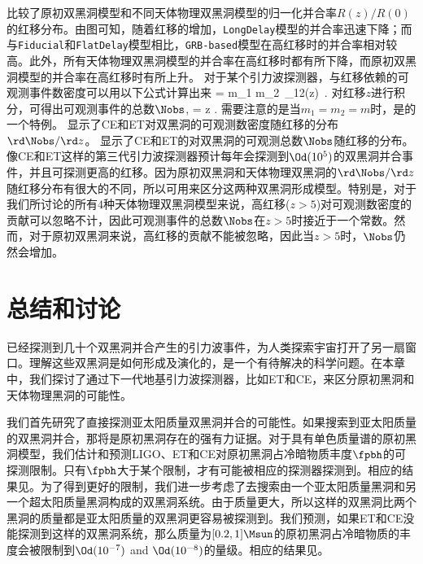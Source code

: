 比较了原初双黑洞模型和不同天体物理双黑洞模型的归一化并合率$R(z)/R(0)$的红移分布。由图可知，随着红移的增加，\texttt{LongDelay}模型的并合率迅速下降；而与\texttt{Fiducial}和\texttt{FlatDelay}模型相比，\texttt{GRB-based}模型在高红移时的并合率相对较高。此外，所有天体物理双黑洞模型的并合率在高红移时都有所下降，而原初双黑洞模型的并合率在高红移时有所上升。
对于某个引力波探测器，与红移依赖的可观测事件数密度可以用以下公式计算出来
\e\label{event_density} 
 = \int \rd m_1 \rd m_2\, \mR_{12}(z)\,
.
\q 
对红移$z$进行积分，可得出可观测事件的总数$\Nobs$,
\e\label{Nobs2} 
\Nobs = \int \rd z .
\q 
需要注意的是当$m_1 = m_2 = m$时，是的一个特例。
显示了CE和ET对双黑洞的可观测数密度随红移的分布$\rd \Nobs/\rd z$。
 显示了CE和ET的对双黑洞的可观测总数$\Nobs$随红移的分布。
像CE和ET这样的第三代引力波探测器预计每年会探测到$\Od(10^5)$的双黑洞并合事件，并且可探测更高的红移。因为原初双黑洞和天体物理双黑洞的$\rd \Nobs/\rd z$随红移分布有很大的不同，所以可用来区分这两种双黑洞形成模型。特别是，对于我们所讨论的所有$4$种天体物理双黑洞模型来说，高红移($z>5$)对可观测数密度的贡献可以忽略不计，因此可观测事件的总数$\Nobs$在$z>5$时接近于一个常数。然而，对于原初双黑洞来说，高红移的贡献不能被忽略，因此当$z>5$时，$\Nobs$仍然会增加。



\section{\label{discuss}总结和讨论}

\lvc 已经探测到几十个双黑洞并合产生的引力波事件，为人类探索宇宙打开了另一扇窗口。理解这些双黑洞是如何形成及演化的，是一个有待解决的科学问题。在本章中，我们探讨了通过下一代地基引力波探测器，比如ET和CE，来区分原初黑洞和天体物理黑洞的可能性。

我们首先研究了直接探测亚太阳质量双黑洞并合的可能性。如果搜索到亚太阳质量的双黑洞并合，那将是原初黑洞存在的强有力证据。对于具有单色质量谱的原初黑洞模型，我们估计和预测LIGO、ET和CE对原初黑洞占冷暗物质丰度$\fpbh$的可探测限制。只有$\fpbh$大于某个限制，才有可能被相应的探测器探测到。相应的结果见。为了得到更好的限制，我们进一步考虑了去搜索由一个亚太阳质量黑洞和另一个超太阳质量黑洞构成的双黑洞系统。由于质量更大，所以这样的双黑洞比两个黑洞的质量都是亚太阳质量的双黑洞更容易被探测到。我们预测，如果ET和CE没能探测到这样的双黑洞系统，那么质量为$[0.2, 1]\Msun$的原初黑洞占冷暗物质的丰度会被限制到$\Od(10^{-7})$ and $\Od(10^{-8})$的量级。相应的结果见。

